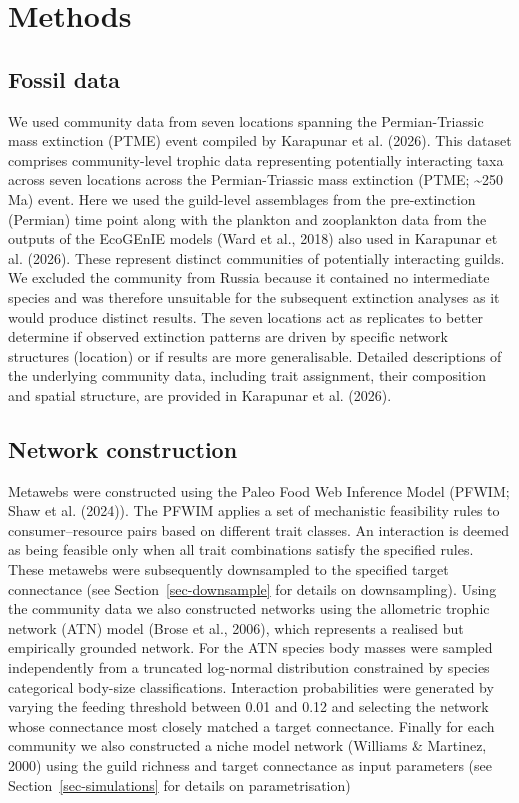 \documentclass[
]{article}
\begin{document}
\section{Methods}\label{methods}

\subsection{Fossil data}\label{fossil-data}

We used community data from seven locations spanning the
Permian-Triassic mass extinction (PTME) event compiled by Karapunar et
al. (2026). This dataset comprises community-level trophic data
representing potentially interacting taxa across seven locations across
the Permian-Triassic mass extinction (PTME; \textasciitilde250 Ma)
event. Here we used the guild-level assemblages from the pre-extinction
(Permian) time point along with the plankton and zooplankton data from
the outputs of the EcoGEnIE models (Ward et al., 2018) also used in
Karapunar et al. (2026). These represent distinct communities of
potentially interacting guilds. We excluded the community from Russia
because it contained no intermediate species and was therefore
unsuitable for the subsequent extinction analyses as it would produce
distinct results. The seven locations act as replicates to better
determine if observed extinction patterns are driven by specific network
structures (location) or if results are more generalisable. Detailed
descriptions of the underlying community data, including trait
assignment, their composition and spatial structure, are provided in
Karapunar et al. (2026).

\subsection{Network construction}\label{network-construction}

Metawebs were constructed using the Paleo Food Web Inference Model
(PFWIM; Shaw et al. (2024)). The PFWIM applies a set of mechanistic
feasibility rules to consumer--resource pairs based on different trait
classes. An interaction is deemed as being feasible only when all trait
combinations satisfy the specified rules. These metawebs were
subsequently downsampled to the specified target connectance (see
Section~\ref{sec-downsample} for details on downsampling). Using the
community data we also constructed networks using the allometric trophic
network (ATN) model (Brose et al., 2006), which represents a realised
but empirically grounded network. For the ATN species body masses were
sampled independently from a truncated log-normal distribution
constrained by species categorical body-size classifications.
Interaction probabilities were generated by varying the feeding
threshold between 0.01 and 0.12 and selecting the network whose
connectance most closely matched a target connectance. Finally for each
community we also constructed a niche model network (Williams \&
Martinez, 2000) using the guild richness and target connectance as input
parameters (see Section~\ref{sec-simulations} for details on
parametrisation)
\end{document}
